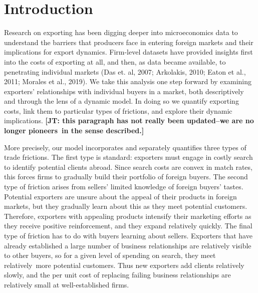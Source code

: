 \documentclass[12pt]{article}
\begin{document}


\thispagestyle{empty}


\newpage

\section{Introduction}

Research on exporting has been digging deeper into microeconomics data to
understand the barriers that producers face in entering foreign markets and
their implications for export dynamics. Firm-level datasets have provided
insights first into the costs of exporting at all, and then, as data became
available, to penetrating individual markets (Das et. al, 2007; Arkolakis,
2010; Eaton et al., 2011; Morales et al., 2019). We take this analysis one
step forward by examining exporters' relationships with individual buyers in
a market, both descriptively and through the lens of a dynamic model. In
doing so we quantify exporting costs, link them to particular types of
frictions, and explore their dynamic implications. \textbf{[JT: this
paragraph has not really been updated--we are no longer pioneers\ in the
sense described.]}

More precisely, our model incorporates and separately quantifies three types
of trade frictions. The first type is standard: exporters must engage in
costly search to identify potential clients abroad. Since search costs are
convex in match rates, this forces firms to gradually build their portfolio
of foreign buyers. The second type of friction arises from sellers' limited
knowledge of foreign buyers' tastes. Potential exporters are unsure about
the appeal of their products in foreign markets, but they gradually learn
about this as they meet potential customers. Therefore, exporters with
appealing products intensify their marketing efforts as they receive
positive reinforcement, and they expand relatively quickly. The final type
of friction has to do with buyers learning about sellers. Exporters that
have already established a large number of business relationships are
relatively visible to other buyers, so for a given level of spending on
search, they meet relatively\ more potential customers. Thus new exporters
add clients relatively slowly, and the per unit cost of replacing failing
business relationships are relatively small at well-established firms.
\end{document}
